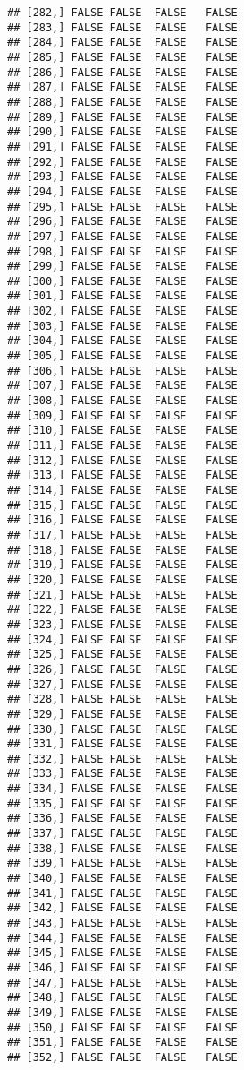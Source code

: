 \documentclass[
]{article}
\begin{document}
\begin{verbatim}
## [282,] FALSE FALSE  FALSE   FALSE
## [283,] FALSE FALSE  FALSE   FALSE
## [284,] FALSE FALSE  FALSE   FALSE
## [285,] FALSE FALSE  FALSE   FALSE
## [286,] FALSE FALSE  FALSE   FALSE
## [287,] FALSE FALSE  FALSE   FALSE
## [288,] FALSE FALSE  FALSE   FALSE
## [289,] FALSE FALSE  FALSE   FALSE
## [290,] FALSE FALSE  FALSE   FALSE
## [291,] FALSE FALSE  FALSE   FALSE
## [292,] FALSE FALSE  FALSE   FALSE
## [293,] FALSE FALSE  FALSE   FALSE
## [294,] FALSE FALSE  FALSE   FALSE
## [295,] FALSE FALSE  FALSE   FALSE
## [296,] FALSE FALSE  FALSE   FALSE
## [297,] FALSE FALSE  FALSE   FALSE
## [298,] FALSE FALSE  FALSE   FALSE
## [299,] FALSE FALSE  FALSE   FALSE
## [300,] FALSE FALSE  FALSE   FALSE
## [301,] FALSE FALSE  FALSE   FALSE
## [302,] FALSE FALSE  FALSE   FALSE
## [303,] FALSE FALSE  FALSE   FALSE
## [304,] FALSE FALSE  FALSE   FALSE
## [305,] FALSE FALSE  FALSE   FALSE
## [306,] FALSE FALSE  FALSE   FALSE
## [307,] FALSE FALSE  FALSE   FALSE
## [308,] FALSE FALSE  FALSE   FALSE
## [309,] FALSE FALSE  FALSE   FALSE
## [310,] FALSE FALSE  FALSE   FALSE
## [311,] FALSE FALSE  FALSE   FALSE
## [312,] FALSE FALSE  FALSE   FALSE
## [313,] FALSE FALSE  FALSE   FALSE
## [314,] FALSE FALSE  FALSE   FALSE
## [315,] FALSE FALSE  FALSE   FALSE
## [316,] FALSE FALSE  FALSE   FALSE
## [317,] FALSE FALSE  FALSE   FALSE
## [318,] FALSE FALSE  FALSE   FALSE
## [319,] FALSE FALSE  FALSE   FALSE
## [320,] FALSE FALSE  FALSE   FALSE
## [321,] FALSE FALSE  FALSE   FALSE
## [322,] FALSE FALSE  FALSE   FALSE
## [323,] FALSE FALSE  FALSE   FALSE
## [324,] FALSE FALSE  FALSE   FALSE
## [325,] FALSE FALSE  FALSE   FALSE
## [326,] FALSE FALSE  FALSE   FALSE
## [327,] FALSE FALSE  FALSE   FALSE
## [328,] FALSE FALSE  FALSE   FALSE
## [329,] FALSE FALSE  FALSE   FALSE
## [330,] FALSE FALSE  FALSE   FALSE
## [331,] FALSE FALSE  FALSE   FALSE
## [332,] FALSE FALSE  FALSE   FALSE
## [333,] FALSE FALSE  FALSE   FALSE
## [334,] FALSE FALSE  FALSE   FALSE
## [335,] FALSE FALSE  FALSE   FALSE
## [336,] FALSE FALSE  FALSE   FALSE
## [337,] FALSE FALSE  FALSE   FALSE
## [338,] FALSE FALSE  FALSE   FALSE
## [339,] FALSE FALSE  FALSE   FALSE
## [340,] FALSE FALSE  FALSE   FALSE
## [341,] FALSE FALSE  FALSE   FALSE
## [342,] FALSE FALSE  FALSE   FALSE
## [343,] FALSE FALSE  FALSE   FALSE
## [344,] FALSE FALSE  FALSE   FALSE
## [345,] FALSE FALSE  FALSE   FALSE
## [346,] FALSE FALSE  FALSE   FALSE
## [347,] FALSE FALSE  FALSE   FALSE
## [348,] FALSE FALSE  FALSE   FALSE
## [349,] FALSE FALSE  FALSE   FALSE
## [350,] FALSE FALSE  FALSE   FALSE
## [351,] FALSE FALSE  FALSE   FALSE
## [352,] FALSE FALSE  FALSE   FALSE

\end{verbatim}
\end{document}
